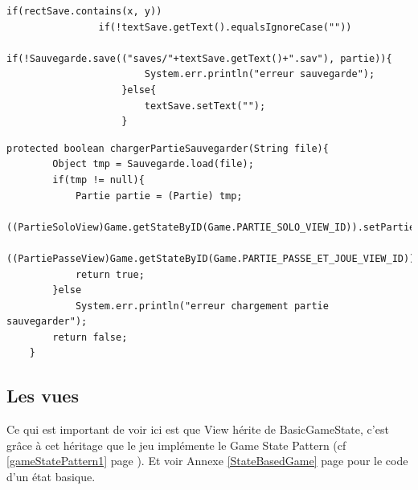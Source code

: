 \documentclass{report}
\begin{document}
\begin{lstlisting}[caption=Sauvegarder une partie (classe PartieView)]
if(rectSave.contains(x, y))
				if(!textSave.getText().equalsIgnoreCase(""))
					if(!Sauvegarde.save(("saves/"+textSave.getText()+".sav"), partie)){
						System.err.println("erreur sauvegarde");
					}else{
						textSave.setText("");
					}
\end{lstlisting}
\begin{lstlisting}[caption=Charger une partie sauvegarder (Classe MainMenuView)]
protected boolean chargerPartieSauvegarder(String file){
		Object tmp = Sauvegarde.load(file);
		if(tmp != null){
			Partie partie = (Partie) tmp;
			((PartieSoloView)Game.getStateByID(Game.PARTIE_SOLO_VIEW_ID)).setPartie(partie);
			((PartiePasseView)Game.getStateByID(Game.PARTIE_PASSE_ET_JOUE_VIEW_ID)).setPartie(partie);
			return true;
		}else
			System.err.println("erreur chargement partie sauvegarder");
		return false;
	}
\end{lstlisting}

\subsection{Les vues}
Ce qui est important de voir ici est que View hérite de BasicGameState, c'est grâce à cet héritage que le jeu implémente le Game State Pattern (cf \ref{gameStatePattern1} page \pageref{gameStatePattern1}). Et voir Annexe \ref{StateBasedGame} page \pageref{StateBasedGame} pour le code d'un état basique.\\
\end{document}

